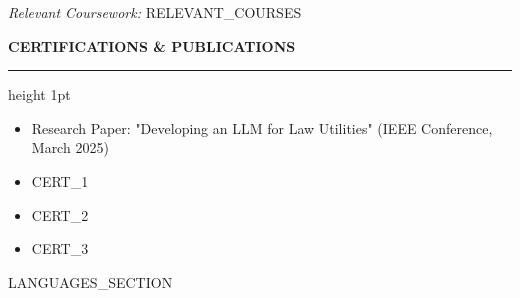 \documentclass[11pt,a4paper,sans]{article}
\newcommand{\resumesection}[1]{%
    \vspace{8pt}
    {\large\bfseries\color{headercolor}#1}
    \vspace{2pt}
    \hrule height 1pt
    \vspace{6pt}
}
\begin{document}
\textit{Relevant Coursework:} {{RELEVANT_COURSES}}


\resumesection{CERTIFICATIONS \& PUBLICATIONS}

\begin{itemize}
    \item Research Paper: "Developing an LLM for Law Utilities" (IEEE Conference, March 2025)
    \item {{CERT_1}}
    \item {{CERT_2}}
    \item {{CERT_3}}
\end{itemize}


{{LANGUAGES_SECTION}}
\end{document}
